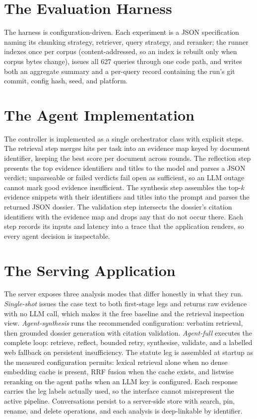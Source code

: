\documentclass{mnnit}
\begin{document}
\section{The Evaluation Harness}
The harness is configuration-driven. Each experiment is a JSON
specification naming its chunking strategy, retriever, query
strategy, and reranker; the runner indexes once per corpus
(content-addressed, so an index is rebuilt only when corpus bytes
change), issues all 627 queries through one code path, and writes
both an aggregate summary and a per-query record containing the
run's git commit, config hash, seed, and platform.

\section{The Agent Implementation}
The controller is implemented as a single orchestrator class with
explicit steps. The retrieval step merges hits per task into an
evidence map keyed by document identifier, keeping the best score
per document across rounds. The reflection step presents the top
evidence identifiers and titles to the model and parses a JSON
verdict; unparseable or failed verdicts fail open as sufficient,
so an LLM outage cannot mark good evidence insufficient. The
synthesis step assembles the top-$k$ evidence snippets with their
identifiers and titles into the prompt and parses the returned
JSON dossier. The validation step intersects the dossier's
citation identifiers with the evidence map and drops any that do
not occur there. Each step records its inputs and latency into a
trace that the application renders, so every agent decision is
inspectable.

\section{The Serving Application}
The server exposes three analysis modes that differ honestly in
what they run. \emph{Single-shot} issues the case text to both
first-stage legs and returns raw evidence with no LLM call, which
makes it the free baseline and the retrieval inspection view.
\emph{Agent-synthesis} runs the recommended configuration:
verbatim retrieval, then grounded dossier generation with
citation validation. \emph{Agent-full} executes the complete
loop: retrieve, reflect, bounded retry, synthesise, validate, and
a labelled web fallback on persistent insufficiency. The statute
leg is assembled at startup as the measured configuration
permits: lexical retrieval alone when no dense embedding cache is
present, RRF fusion when the cache exists, and listwise reranking
on the agent paths when an LLM key is configured. Each response
carries the leg labels actually used, so the interface cannot
misrepresent the active pipeline. Conversations persist to a
server-side store with search, pin, rename, and delete
operations, and each analysis is deep-linkable by identifier.
\end{document}
